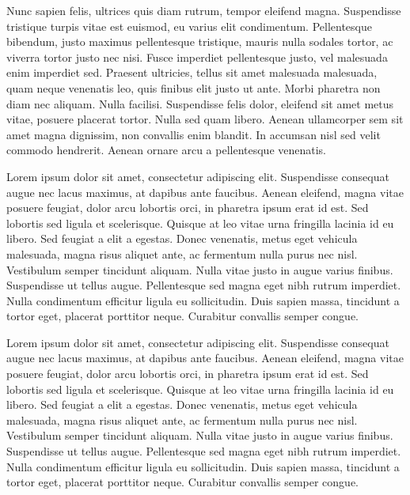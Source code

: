 \documentclass{article}
\begin{document}
	\singlespacing
	Nunc sapien felis, ultrices quis diam rutrum, tempor eleifend magna. Suspendisse tristique turpis vitae est euismod, eu varius elit condimentum. Pellentesque bibendum, justo maximus pellentesque tristique, mauris nulla sodales tortor, ac viverra tortor justo nec nisi. Fusce imperdiet pellentesque justo, vel malesuada enim imperdiet sed. Praesent ultricies, tellus sit amet malesuada malesuada, quam neque venenatis leo, quis finibus elit justo ut ante. Morbi pharetra non diam nec aliquam. Nulla facilisi. Suspendisse felis dolor, eleifend sit amet metus vitae, posuere placerat tortor. Nulla sed quam libero. Aenean ullamcorper sem sit amet magna dignissim, non convallis enim blandit. In accumsan nisl sed velit commodo hendrerit. Aenean ornare arcu a pellentesque venenatis.
	
	\begin{doublespace}
		Lorem ipsum dolor sit amet, consectetur adipiscing elit. Suspendisse consequat augue nec lacus maximus, at dapibus ante faucibus. Aenean eleifend, magna vitae posuere feugiat, dolor arcu lobortis orci, in pharetra ipsum erat id est. Sed lobortis sed ligula et scelerisque. Quisque at leo vitae urna fringilla lacinia id eu libero. Sed feugiat a elit a egestas. Donec venenatis, metus eget vehicula malesuada, magna risus aliquet ante, ac fermentum nulla purus nec nisl. Vestibulum semper tincidunt aliquam. Nulla vitae justo in augue varius finibus. Suspendisse ut tellus augue. Pellentesque sed magna eget nibh rutrum imperdiet. Nulla condimentum efficitur ligula eu sollicitudin. Duis sapien massa, tincidunt a tortor eget, placerat porttitor neque. Curabitur convallis semper congue.
	\end{doublespace}
	
	\begin{spacing}{3}
		Lorem ipsum dolor sit amet, consectetur adipiscing elit. Suspendisse consequat augue nec lacus maximus, at dapibus ante faucibus. Aenean eleifend, magna vitae posuere feugiat, dolor arcu lobortis orci, in pharetra ipsum erat id est. Sed lobortis sed ligula et scelerisque. Quisque at leo vitae urna fringilla lacinia id eu libero. Sed feugiat a elit a egestas. Donec venenatis, metus eget vehicula malesuada, magna risus aliquet ante, ac fermentum nulla purus nec nisl. Vestibulum semper tincidunt aliquam. Nulla vitae justo in augue varius finibus. Suspendisse ut tellus augue. Pellentesque sed magna eget nibh rutrum imperdiet. Nulla condimentum efficitur ligula eu sollicitudin. Duis sapien massa, tincidunt a tortor eget, placerat porttitor neque. Curabitur convallis semper congue.
	\end{spacing}
\end{document}
